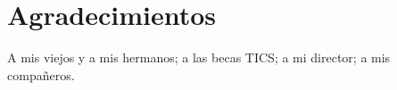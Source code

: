 \chapter*{Agradecimientos}

\noindent A mis viejos y a mis hermanos; a las becas TICS; a mi director; a mis compañeros.
